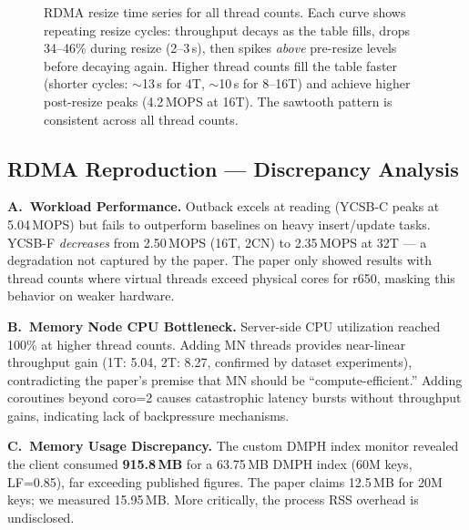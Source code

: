 \documentclass[11pt,a4paper]{article}
\begin{document}
\begin{figure}[H]
\caption{RDMA resize time series for all thread counts. Each curve shows repeating resize cycles: throughput decays as the table fills, drops 34--46\% during resize (2--3\,s), then spikes \emph{above} pre-resize levels before decaying again. Higher thread counts fill the table faster (shorter cycles: $\sim$13\,s for 4T, $\sim$10\,s for 8--16T) and achieve higher post-resize peaks (4.2\,MOPS at 16T). The sawtooth pattern is consistent across all thread counts.}
\label{fig:rdma-resize-ts}
\end{figure}

\subsection{RDMA Reproduction --- Discrepancy Analysis}

\textbf{A.\ Workload Performance.}
Outback excels at reading (YCSB-C peaks at 5.04\,MOPS) but fails to outperform baselines on heavy insert/update tasks. YCSB-F \emph{decreases} from 2.50\,MOPS (16T, 2CN) to 2.35\,MOPS at 32T --- a degradation not captured by the paper. The paper only showed results with thread counts where virtual threads exceed physical cores for r650, masking this behavior on weaker hardware.

\textbf{B.\ Memory Node CPU Bottleneck.}
Server-side CPU utilization reached 100\% at higher thread counts. Adding MN threads provides near-linear throughput gain (1T: 5.04, 2T: 8.27, confirmed by dataset experiments), contradicting the paper's premise that MN should be ``compute-efficient.'' Adding coroutines beyond coro=2 causes catastrophic latency bursts without throughput gains, indicating lack of backpressure mechanisms.

\textbf{C.\ Memory Usage Discrepancy.}
The custom DMPH index monitor revealed the client consumed \textbf{915.8\,MB} for a 63.75\,MB DMPH index (60M keys, LF=0.85), far exceeding published figures. The paper claims 12.5\,MB for 20M keys; we measured 15.95\,MB. More critically, the process RSS overhead is undisclosed.
\end{document}
